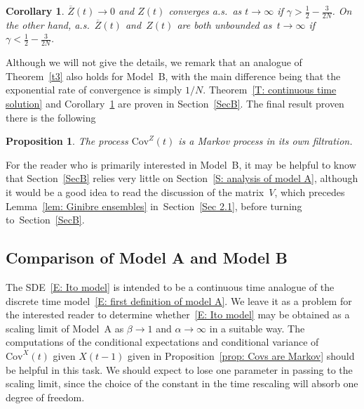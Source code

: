 \documentclass[12pt]{article}
\newtheorem{corollary}{Corollary}
\newtheorem{proposition}{Proposition}
\newcommand{\1}{\mathbf{1}}
\begin{document}
\begin{corollary}\label{C: critical gamma}
$\overline{Z}(t) \to 0$ and $Z(t)$ converges a.s.~as $t \to \infty$ if $\gamma > \frac{1}{2} - \frac{3}{2N}$. On the other hand, a.s.~$\overline{Z}(t)$ and~$Z(t)$ are both unbounded as~$t \to \infty$ if $\gamma < \frac{1}{2} - \frac{3}{2N}$. 
\end{corollary}
Although we will not give the details, we remark that an analogue of Theorem~\ref{t3} also holds for Model~B, with the main difference being that the exponential rate of convergence is simply $1/N$. Theorem~\ref{T: continuous time solution} and Corollary~\ref{C: critical gamma} are proven in Section~\ref{SecB}. The final result proven there is the following 
\begin{proposition}\label{P: covariance is Markov in model B} 
The process $\mathrm{Cov}^Z(t)$ is a Markov process in its own filtration.
\end{proposition}
For the reader who is primarily interested in Model~B, it may be helpful to know that Section~\ref{SecB} relies very little on Section~\ref{S: analysis of model A}, although it would be a good idea to read the discussion of the matrix~$V$, which precedes Lemma~\ref{lem: Ginibre ensembles} in~Section~\ref{Sec 2.1}, before turning to~Section~\ref{SecB}.

\subsection{Comparison of Model A and Model B}

The SDE~\eqref{E: Ito model} is intended to be a continuous time analogue of the discrete time model~\eqref{E: first definition of model A}. We leave it as a problem for the interested reader to determine whether~\eqref{E: Ito model} may be obtained as a scaling limit of Model~A as $\beta \to 1$ and $\alpha \to \infty$ in a suitable way. The computations of the conditional expectations and conditional variance of $\mathrm{Cov}^X(t)$ given $X(t-1)$ given in Proposition~\ref{prop: Covs are Markov} should be helpful in this task.  We should expect to lose one parameter in passing to the scaling limit, since the choice of the constant in the time rescaling will absorb one degree of freedom.
\end{document}
